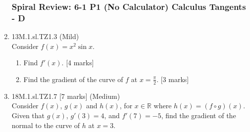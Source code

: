 \documentclass[12pt, twoside]{article}
\begin{document}
\begin{enumerate}
\newpage
\setcounter{enumi}{0}
\subsubsection*{Spiral Review: 6-1 P1 (No Calculator) Calculus Tangents - D}

  \item 13M.1.sl.TZ1.3 (Mild)\\
  Consider $f(x)=x^2 \sin x$.
  \begin{enumerate}
    \item Find $f'(x)$. [4 marks]
    \item Find the gradient of the curve of $f$ at $x= \frac{\pi}{2}$. [3 marks]
  \end{enumerate}

  \item 18M.1.sl.TZ1.7 [7 marks] (Medium)\\
  Consider $f(x)$, $g(x)$ and $h(x)$, for $x \in \mathbb{R}$ where $h(x)=(f \circ g)(x)$.\\
  Given that $g(x)$, $g'(3)=4$, and $f'(7)=-5$, find the gradient of the normal to the curve of $h$ at $x=3$.


\end{enumerate}
\end{document}
